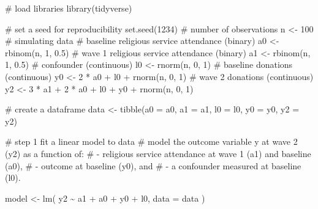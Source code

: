 \documentclass[
  singlecolumn]{article}
\newenvironment{Shaded}{\begin{snugshade}}{\end{snugshade}}
\newcommand{\AttributeTok}[1]{\textcolor[rgb]{0.40,0.45,0.13}{#1}}
\newcommand{\CommentTok}[1]{\textcolor[rgb]{0.37,0.37,0.37}{#1}}
\newcommand{\DecValTok}[1]{\textcolor[rgb]{0.68,0.00,0.00}{#1}}
\newcommand{\FloatTok}[1]{\textcolor[rgb]{0.68,0.00,0.00}{#1}}
\newcommand{\FunctionTok}[1]{\textcolor[rgb]{0.28,0.35,0.67}{#1}}
\newcommand{\NormalTok}[1]{\textcolor[rgb]{0.00,0.23,0.31}{#1}}
\newcommand{\OtherTok}[1]{\textcolor[rgb]{0.00,0.23,0.31}{#1}}
\newcommand{\SpecialCharTok}[1]{\textcolor[rgb]{0.37,0.37,0.37}{#1}}
\begin{document}
\begin{Shaded}
\begin{Highlighting}[]
\CommentTok{\# load libraries}
\FunctionTok{library}\NormalTok{(tidyverse)}

\CommentTok{\# set a seed for reproducibility}
\FunctionTok{set.seed}\NormalTok{(}\DecValTok{1234}\NormalTok{)}
\CommentTok{\# number of observations}
\NormalTok{n }\OtherTok{\textless{}{-}} \DecValTok{100}
\CommentTok{\# simulating data}
\CommentTok{\# baseline religious service attendance (binary)}
\NormalTok{a0 }\OtherTok{\textless{}{-}} \FunctionTok{rbinom}\NormalTok{(n, }\DecValTok{1}\NormalTok{, }\FloatTok{0.5}\NormalTok{)}
\CommentTok{\# wave 1 religious service attendance (binary)}
\NormalTok{a1 }\OtherTok{\textless{}{-}} \FunctionTok{rbinom}\NormalTok{(n, }\DecValTok{1}\NormalTok{, }\FloatTok{0.5}\NormalTok{)}
\CommentTok{\# confounder (continuous)}
\NormalTok{l0 }\OtherTok{\textless{}{-}} \FunctionTok{rnorm}\NormalTok{(n, }\DecValTok{0}\NormalTok{, }\DecValTok{1}\NormalTok{)}
\CommentTok{\# baseline donations (continuous)}
\NormalTok{y0 }\OtherTok{\textless{}{-}} \DecValTok{2} \SpecialCharTok{*}\NormalTok{ a0 }\SpecialCharTok{+}\NormalTok{ l0 }\SpecialCharTok{+} \FunctionTok{rnorm}\NormalTok{(n, }\DecValTok{0}\NormalTok{, }\DecValTok{1}\NormalTok{)}
\CommentTok{\# wave 2 donations (continuous)}
\NormalTok{y2 }\OtherTok{\textless{}{-}} \DecValTok{3} \SpecialCharTok{*}\NormalTok{ a1 }\SpecialCharTok{+} \DecValTok{2} \SpecialCharTok{*}\NormalTok{ a0 }\SpecialCharTok{+}\NormalTok{ l0 }\SpecialCharTok{+}\NormalTok{ y0 }\SpecialCharTok{+} \FunctionTok{rnorm}\NormalTok{(n, }\DecValTok{0}\NormalTok{, }\DecValTok{1}\NormalTok{)}

\CommentTok{\# create a dataframe}
\NormalTok{data }\OtherTok{\textless{}{-}} \FunctionTok{tibble}\NormalTok{(}\AttributeTok{a0 =}\NormalTok{ a0, }
               \AttributeTok{a1 =}\NormalTok{ a1, }
               \AttributeTok{l0 =}\NormalTok{ l0, }
               \AttributeTok{y0 =}\NormalTok{ y0, }
               \AttributeTok{y2 =}\NormalTok{ y2)}

\CommentTok{\# step 1 fit a linear model to data}
\CommentTok{\#  model the outcome variable y at wave 2 (y2) as a function of:}
\CommentTok{\# {-} religious service attendance at wave 1 (a1) and baseline (a0),}
\CommentTok{\# {-} outcome at baseline (y0), and}
\CommentTok{\# {-} a confounder measured at baseline (l0).}

\NormalTok{model }\OtherTok{\textless{}{-}} \FunctionTok{lm}\NormalTok{( }
\NormalTok{  y2 }\SpecialCharTok{\textasciitilde{}}\NormalTok{ a1 }\SpecialCharTok{+}\NormalTok{ a0 }\SpecialCharTok{+}\NormalTok{ y0 }\SpecialCharTok{+}\NormalTok{ l0, }
  \AttributeTok{data =}\NormalTok{ data}
\NormalTok{  )}


\end{Highlighting}
\end{Shaded}
\end{document}
